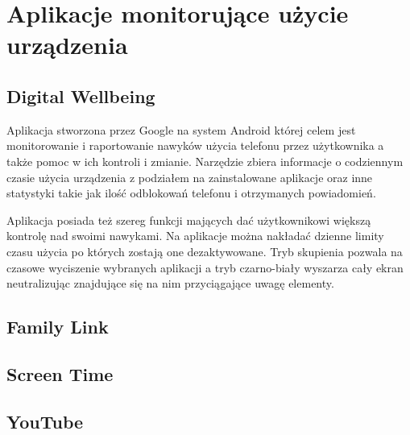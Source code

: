 \section{Aplikacje monitorujące użycie urządzenia}

\subsection{Digital Wellbeing}
Aplikacja stworzona przez Google na system Android której celem jest monitorowanie i raportowanie nawyków użycia telefonu przez użytkownika a także pomoc w ich kontroli i zmianie. Narzędzie zbiera informacje o codziennym czasie użycia urządzenia z podziałem na zainstalowane aplikacje oraz inne statystyki takie jak ilość odblokowań telefonu i otrzymanych powiadomień. 
\bigskip
{}

Aplikacja posiada też szereg funkcji mających dać użytkownikowi większą kontrolę nad swoimi nawykami. Na aplikacje można nakładać dzienne limity czasu użycia po których zostają one dezaktywowane. Tryb skupienia pozwala na czasowe wyciszenie wybranych aplikacji a tryb czarno-biały wyszarza cały ekran neutralizując znajdujące się na nim przyciągające uwagę elementy.

\subsection{Family Link}

\subsection{Screen Time}

\subsection{YouTube}
